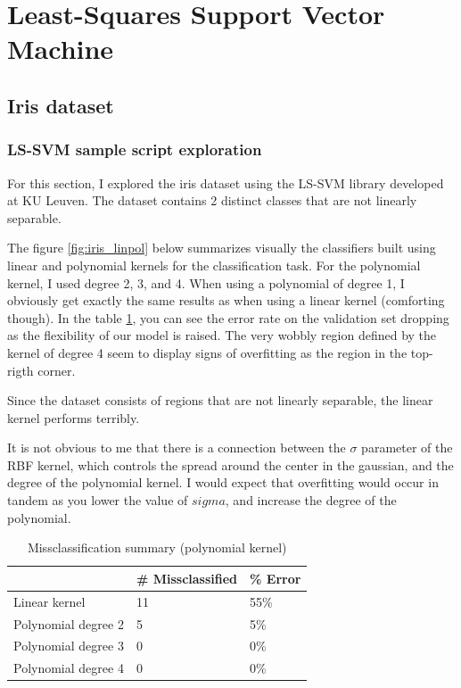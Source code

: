 \documentclass[11pt, a4paper]{article}
\begin{document}
\section{Least-Squares Support Vector Machine}

\subsection{Iris dataset}

\subsubsection{LS-SVM sample script exploration}
For this section, I explored the iris dataset using the LS-SVM library
developed at KU Leuven. The dataset contains 2 distinct classes that
are not linearly separable.

The figure \ref{fig:iris_linpol} below summarizes visually the
classifiers built using linear and polynomial kernels for the
classification task. For the polynomial kernel, I used degree 2, 3,
and 4. When using a polynomial of degree 1, I obviously get exactly
the same results as when using a linear kernel (comforting though). In
the table \ref{table:iris_linpol}, you can see the error rate on
the validation set dropping as the flexibility of our model is
raised. The very wobbly region defined by the kernel of degree 4 seem
to display signs of overfitting as the region in the top-rigth corner.

Since the dataset consists of regions that are not linearly separable,
the linear kernel performs terribly.

It is not obvious to me that there is a connection between the
$\sigma$ parameter of the RBF kernel, which controls the spread around
the center in the gaussian, and the degree of the polynomial kernel. I
would expect that overfitting would occur in tandem as you lower the
value of $sigma$, and increase the degree of the polynomial.

\begin{table}[H]
  \centering
  \begin{tabular}{l|l|l|}
    \cline{2-3}
    & \# Missclassified & \% Error \\ \hline
    \multicolumn{1}{|l|}{Linear kernel}       & 11                & 55\%     \\ \hline
    \multicolumn{1}{|l|}{Polynomial degree 2} & 5                 & 5\%      \\ \hline
    \multicolumn{1}{|l|}{Polynomial degree 3} & 0                 & 0\%      \\ \hline
    \multicolumn{1}{|l|}{Polynomial degree 4} & 0                 & 0\%      \\ \hline
  \end{tabular}
  \caption{Missclassification summary (polynomial kernel)}
  \label{table:iris_linpol}
\end{table}
\end{document}
